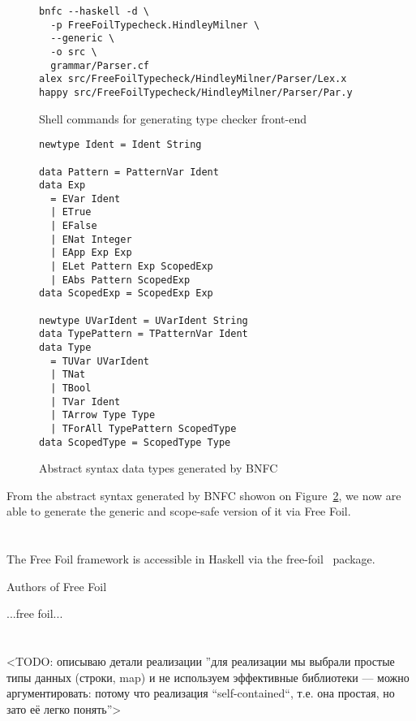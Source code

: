 \begin{figure}[H]
  \begin{verbatim}
bnfc --haskell -d \
  -p FreeFoilTypecheck.HindleyMilner \
  --generic \
  -o src \
  grammar/Parser.cf
alex src/FreeFoilTypecheck/HindleyMilner/Parser/Lex.x
happy src/FreeFoilTypecheck/HindleyMilner/Parser/Par.y
  \end{verbatim}
  \caption{Shell commands for generating type checker front-end}
  \label{fig:code-gen-cli}
\end{figure}

\begin{figure}[H]
\begin{verbatim}
newtype Ident = Ident String

data Pattern = PatternVar Ident
data Exp
  = EVar Ident
  | ETrue
  | EFalse
  | ENat Integer
  | EApp Exp Exp
  | ELet Pattern Exp ScopedExp
  | EAbs Pattern ScopedExp
data ScopedExp = ScopedExp Exp

newtype UVarIdent = UVarIdent String
data TypePattern = TPatternVar Ident
data Type
  = TUVar UVarIdent
  | TNat
  | TBool
  | TVar Ident
  | TArrow Type Type
  | TForAll TypePattern ScopedType
data ScopedType = ScopedType Type
\end{verbatim}
  \caption{Abstract syntax data types generated by BNFC}
  \label{fig:ast-types-bnfs}
\end{figure}

From the abstract syntax generated by BNFC showon on Figure~\ref{fig:ast-types-bnfs}, we now are able to generate the generic and scope-safe version of it via Free Foil.

\section{}

The Free Foil framework is accessible in Haskell via the free-foil~\cite{free-foil} package.

Authors of Free Foil

...free foil...

\section{}

<TODO: описываю детали реализации ”для реализации мы выбрали простые типы данных (строки, map) и не используем эффективные библиотеки — можно аргументировать: потому что реализация “self-contained“, т.е. она простая, но зато её легко понять”>

